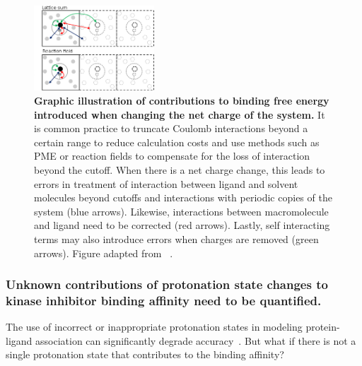 \documentclass[10pt,final]{article}
\begin{document}
\begin{figure}[H]
  \centering
  \includegraphics[width=0.4\textwidth]{figures/reif_oostenbrink.png}
    \caption{\textbf{Graphic illustration of contributions to binding free energy introduced when changing the net charge of the system.}  It is common practice to truncate Coulomb interactions beyond a certain range to reduce calculation costs and use methods such as PME or reaction fields to compensate for the loss of interaction beyond the cutoff. When there is a net charge change, this leads to errors in treatment of interaction between ligand and solvent molecules beyond cutoffs and interactions with periodic copies of the system (blue arrows). Likewise, interactions between macromolecule and ligand need to be corrected (red arrows). Lastly, self interacting terms may also introduce errors when charges are removed (green arrows). Figure adapted from ~\textcite{Reif2013a}.}
  \label{figure:chargecorrections}
\end{figure}

\subsubsection*{Unknown contributions of protonation state changes to kinase inhibitor binding affinity need to be quantified.}
The use of incorrect or inappropriate protonation states in modeling protein-ligand association can significantly degrade accuracy~\autocite{Polgar2005a,Wittayanarakul2008a}.
But what if there is not a single protonation state that contributes to the binding affinity?
\end{document}
